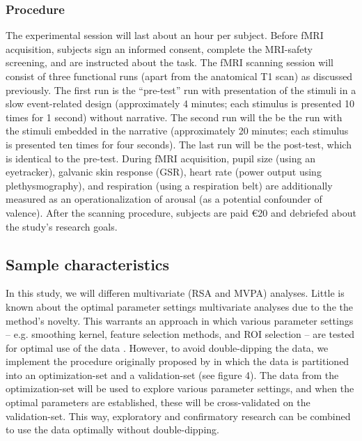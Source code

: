 \documentclass[12pt,a4paper]{article}\usepackage[]{graphicx}\usepackage[]{color}
\begin{document}
\subsubsection{Procedure}
The experimental session will last about an hour per subject. Before fMRI acquisition, subjects sign an informed consent, complete the MRI-safety screening, and are instructed about the task. The fMRI scanning session will consist of three functional runs (apart from the anatomical T1 scan) as discussed previously. The first run is the ``pre-test'' run with presentation of the stimuli in a slow event-related design (approximately 4 minutes; each stimulus is presented 10 times for 1 second) without narrative. The second run will the be the run with the stimuli embedded in the narrative (approximately 20 minutes; each stimulus is presented ten times for four seconds). The last run will be the post-test, which is identical to the pre-test. During fMRI acquisition, pupil size (using an eyetracker), galvanic skin response (GSR), heart rate (power output using plethysmography), and respiration (using a respiration belt) are additionally measured as an operationalization of arousal (as a potential confounder of valence). After the scanning procedure, subjects are paid \euro 20 and debriefed about the study's research goals. 

\subsection{Sample characteristics}
In this study, we will differen multivariate (RSA and MVPA) analyses. Little is known about the optimal parameter settings multivariate analyses due to the the method's novelty. This warrants an approach in which various parameter settings -- e.g. smoothing kernel, feature selection methods, and ROI selection -- are tested for optimal use of the data \citep{kragel2012}. However, to avoid double-dipping the data, we implement the procedure originally proposed by \cite{kriegeskorte2009} in which the data is partitioned into an optimization-set and a validation-set (see figure 4). The data from the optimization-set will be used to explore various parameter settings, and when the optimal parameters are established, these will be cross-validated on the validation-set. This way, exploratory and confirmatory research can be combined to use the data optimally without double-dipping. 
\end{document}
